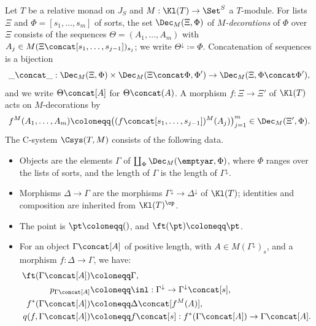 \begin{definition}\label{def:sorted-c-system}
    Let $T$ be a relative monad on $J_S$ and $M : \Kl(T) \to \Set^S$ a $T$-module. For lists $\Xi$ and $\Phi = [s_1, \ldots, s_m]$ of sorts, the set $\Dec_M(\Xi, \Phi)$ of \emph{$M$-decorations} of $\Phi$ over $\Xi$ consists of the sequences $\Theta = (A_1, \ldots, A_m)$ with $A_j \in M(\Xi \concat [s_1, \ldots, s_{j-1}])_{s_j}$; we write $\Theta^{\downarrow} \coloneqq \Phi$. Concatenation of sequences is a bijection
    \[
        \_ \concat \_ : \Dec_M(\Xi, \Phi) \times \Dec_M(\Xi \concat \Phi, \Phi') \to \Dec_M(\Xi, \Phi \concat \Phi'),
    \]
    and we write $\Theta \concat [A]$ for $\Theta \concat (A)$. A morphism $f : \Xi \to \Xi'$ of $\Kl(T)$ acts on $M$-decorations by
    \[
        f^M(A_1, \ldots, A_m) \coloneqq \big((f \concat [s_1, \ldots, s_{j-1}])^M(A_j)\big)_{j = 1}^m \in \Dec_M(\Xi', \Phi).
    \]
    The C-system $\Csys(T, M)$ consists of the following data.
    \begin{itemize}
        \item Objects are the elements $\Gamma$ of $\coprod_{\Phi} \Dec_M(\emptyar, \Phi)$, where $\Phi$ ranges over the lists of sorts, and the length of $\Gamma$ is the length of $\Gamma^{\downarrow}$.
        \item Morphisms $\Delta \to \Gamma$ are the morphisms $\Gamma^{\downarrow} \to \Delta^{\downarrow}$ of $\Kl(T)$; identities and composition are inherited from $\Kl(T)^{\op}$.
        \item The point is $\pt \coloneqq ()$, and $\ft(\pt) \coloneqq \pt$.
        \item For an object $\Gamma \concat [A]$ of positive length, with $A \in M(\Gamma^{\downarrow})_s$, and a morphism $f : \Delta \to \Gamma$, we have:
        \begin{align*}
            \ft(\Gamma \concat [A]) &\coloneqq \Gamma,\\
            p_{\Gamma \concat [A]} &\coloneqq \inl : \Gamma^{\downarrow} \to \Gamma^{\downarrow} \concat [s],\\
            f^*(\Gamma \concat [A]) &\coloneqq \Delta \concat [f^M(A)],\\
            q(f, \Gamma \concat [A]) &\coloneqq f \concat [s] : f^*(\Gamma \concat [A]) \to \Gamma \concat [A].
        \end{align*}
    \end{itemize}
\end{definition}

